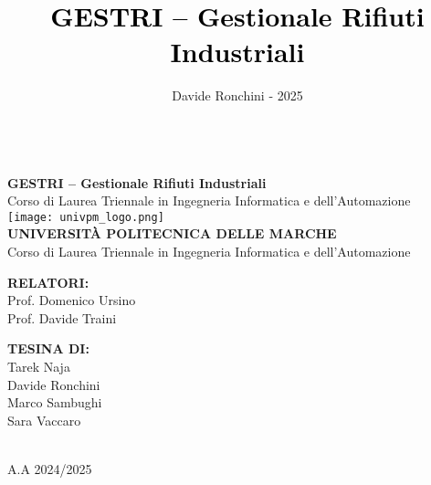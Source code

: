 \documentclass[a4paper]{report}
\title{\huge \textbf{\textcolor{black}{GESTRI – Gestionale Rifiuti Industriali}}\\}
\author{Davide Ronchini - 2025}
\date{}
\begin{document}
\thispagestyle{empty} %


\begin{center}
    \vphantom{space} \\[0.5cm]
    {\Large \textbf{\textcolor{myColor}{GESTRI – Gestionale Rifiuti Industriali}}}\\[0.3cm]
    
    {\normalsize Corso di Laurea Triennale in Ingegneria Informatica e dell’Automazione}\\[2cm]
    
    \texttt{[image: univpm\_logo.png]}\\[2cm]
    
    {\large \textbf{\textcolor{myColor}{UNIVERSITÀ POLITECNICA DELLE MARCHE}}}\\ [0.3cm]
    {\normalsize Corso di Laurea Triennale in Ingegneria Informatica e dell’Automazione}\\[2cm]
    
    \begin{minipage}{0.45\textwidth}
        \begin{flushleft}
        \textbf{\textcolor{myColor}{RELATORI:}}\\[0.2cm]
        Prof. Domenico Ursino\\
        Prof. Davide Traini
        \end{flushleft}
    \end{minipage}
    \hfill
    \begin{minipage}{0.45\textwidth}
        \begin{flushright}
        \textbf{\textcolor{myColor}{TESINA DI:}}\\[0.2cm]
        Tarek Naja \\
        Davide Ronchini\\
        Marco Sambughi \\
        Sara Vaccaro
        \end{flushright}
    \end{minipage}\\[5.5cm]
    
    {\normalsize A.A 2024/2025}
\end{center}
\end{document}
